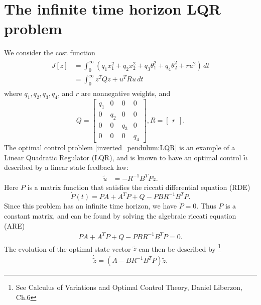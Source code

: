 \section*{The infinite time horizon LQR problem}
We consider the cost function
\begin{align}
\begin{split}
J[z] &= \int_0^{\infty} (q_1x_1^2 + q_2x_2^2  + q_3\theta_1^2 + q_4\theta_2^2 + ru^2)\, dt\\
&= \int_0^{\infty} z^TQz + u^TRu \, dt
\end{split} \label{inverted_pendulum:LQR}
\end{align}
where $q_1, q_2, q_3, q_4$, and $r$ are nonnegative weights, and 
\[
Q = 
\begin{bmatrix}
q_1 & 0 & 0 & 0 \\
0 & q_2 & 0 & 0\\
0 & 0 & q_3 & 0 \\
0 & 0 & 0 & q_4
\end{bmatrix}, R = \begin{bmatrix} r \end{bmatrix}.
\]
The optimal control problem \eqref{inverted_pendulum:LQR} is an example of a Linear Quadratic Regulator (LQR), and is known to have an optimal control $\tilde{u}$ described by a linear state feedback law:
\begin{align}
\tilde{u} &= -R^{-1}B^TP\tilde{z}.
\end{align}
Here $P$ is a matrix function that satisfies the riccati differential equation (RDE)
\[
\dot{P}(t) = PA + A^TP + Q - PBR^{-1}B^T P.  
\]
Since this problem has an infinite time horizon, we have $\dot{P} = 0$. Thus $P$ is a constant matrix, and can be found by solving the algebraic riccati equation (ARE)
\begin{align}
 PA + A^TP + Q - PBR^{-1}B^T P = 0.  \label{inverted_pendulum:ARE}
\end{align}
The evolution of the optimal state vector $\tilde{z}$ can then be described by \footnote{See Calculus of Variations and Optimal Control Theory, Daniel Liberzon, Ch.6}
\begin{align}
\dot{\tilde{z}} = (A - BR^{-1}B^TP)\tilde{z}. \label{inverted_pendulum:optimal_state}
\end{align}

